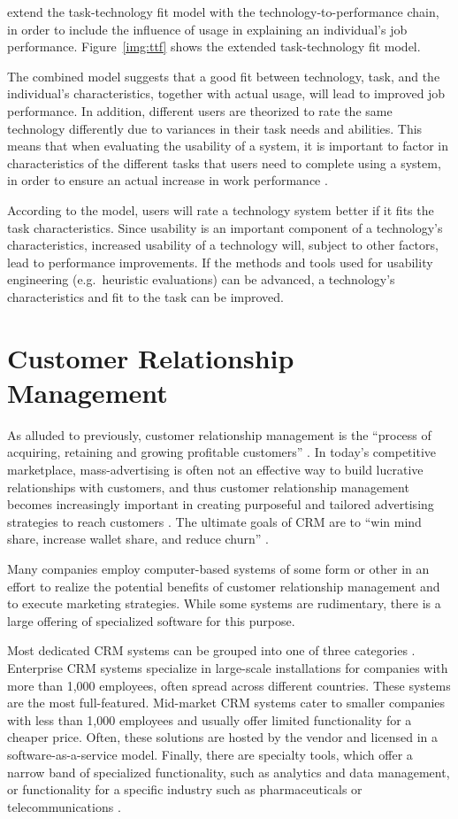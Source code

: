  extend the task-technology fit model with the tech\-no\-logy-to-performance chain, in order to include the influence of usage in explaining an individual's job performance. Figure~\ref{img:ttf} shows the extended task-technology fit model.

The combined model suggests that a good fit between technology, task, and the individual's characteristics, together with actual usage, will lead to improved job performance. In addition, different users are theorized to rate the same technology differently due to variances in their task needs and abilities. This means that when evaluating the usability of a system, it is important to factor in characteristics of the different tasks that users need to complete using a system, in order to ensure an actual increase in work performance \citep{Goodhue2006}.

According to the model, users will rate a technology system better if it fits the task characteristics. Since usability is an important component of a technology's characteristics, increased usability of a technology will, subject to other factors, lead to performance improvements. If the methods and tools used for usability engineering (e.g.\ heuristic evaluations) can be advanced, a technology's characteristics and fit to the task can be improved.

\section{Customer Relationship Management}
As alluded to previously, customer relationship management is the ``process of acquiring, retaining and growing profitable customers'' \citep[p.\ 8]{Brown2000}. In today's competitive marketplace, mass-advertising is often not an effective way to build lucrative relationships with customers, and thus customer relationship management becomes increasingly important in creating purposeful and tailored advertising strategies to reach customers \citep{McKenzie2001,Brown2000}. The ultimate goals of CRM are to ``win mind share, increase wallet share, and reduce churn'' \citep{McKenzie2001}.

Many companies employ computer-based systems of some form or other in an effort to realize the potential benefits of customer relationship management and to execute marketing strategies. While some systems are rudimentary, there is a large offering of specialized software for this purpose.

Most dedicated CRM systems can be grouped into one of three categories \citep{Band2010}. Enterprise CRM systems specialize in large-scale installations for companies with more than 1,000 employees, often spread across different countries. These systems are the most full-featured. Mid-market CRM systems cater to smaller companies with less than 1,000 employees and usually offer limited functionality for a cheaper price. Often, these solutions are hosted by the vendor and licensed in a software-as-a-service model. Finally, there are specialty tools, which offer a narrow band of specialized functionality, such as analytics and data management, or functionality for a specific industry such as pharmaceuticals or telecommunications \citep{Band2010}.

